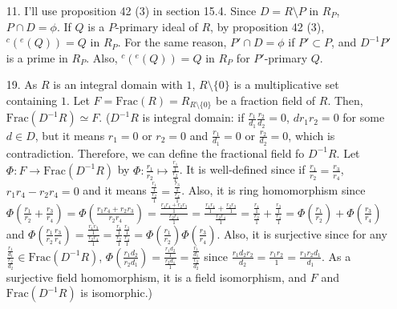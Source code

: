\documentclass[12pt]{article}
\begin{document}
\begin{enumerate}
\newpage
\item[11.] I'll use proposition 42 (3) in section 15.4. Since $D=R\setminus P$ in $R_P$, $P\cap D=\phi$. If $Q$ is a $P$-primary ideal of $R$, by proposition 42 (3), $^{c}(^{e}(Q))=Q$ in $R_P$. For the same reason, $P'\cap D=\phi$ if $P'\subset P$, and $D^{-1}P'$ is a prime in $R_P$. Also, $^{c}(^{e}(Q))=Q$ in $R_P$ for $P'$-primary $Q$.
\newpage
\item[19.] As $R$ is an integral domain with $1$, $R\setminus\{0\}$ is a multiplicative set containing $1$. Let $F=\text{Frac}(R)=R_{R\setminus\{0\}}$ be a fraction field of $R$. Then, $\text{Frac}(D^{-1}R)\simeq F$. ($D^{-1}R$ is integral domain: if $\frac{r_1}{d_1}\frac{r_2}{d_2}=0$, $dr_1r_2=0$ for some $d\in D$, but it means $r_1=0$ or $r_2=0$ and $\frac{r_1}{d_1}=0$ or $\frac{r_2}{d_2}=0$, which is contradiction. Therefore, we can define the fractional field fo $D^{-1}R$. Let $\Phi:F\rightarrow \text{Frac}(D^{-1}R)$ by $\Phi:\frac{r_1}{r_2}\mapsto \frac{\frac{r_1}{1}}{\frac{r_2}{1}}$. It is well-defined since if $\frac{r_1}{r_2}=\frac{r_3}{r_4}$, $r_1r_4-r_2r_4=0$ and it means $\frac{\frac{r_1}{1}}{\frac{r_2}{1}}=\frac{\frac{r_3}{1}}{\frac{r_4}{1}}$. Also, it is ring homomorphism since $\Phi\left(\frac{r_1}{r_2}+\frac{r_3}{r_4}\right)=\Phi\left(\frac{r_1r_4+r_2r_3}{r_2r_4}\right)= \frac{\frac{r_1r_4+r_2r_3}{1}}{\frac{r_2r_4}{1}}=\frac{\frac{r_1r_4}{1}+\frac{r_2r_3}{1}}{\frac{r_2r_4}{1}}=\frac{\frac{r_1}{1}}{\frac{r_2}{1}}+\frac{\frac{r_3}{1}}{\frac{r_4}{1}}=\Phi\left(\frac{r_1}{r_2}\right)+\Phi\left(\frac{r_3}{r_4}\right)$ and $\Phi\left(\frac{r_1}{r_2}\frac{r_3}{r_4}\right)=\frac{\frac{r_1r_3}{1}}{\frac{r_2r_4}{1}}=\frac{\frac{r_1}{1}}{\frac{r_2}{1}}\frac{\frac{r_3}{1}}{\frac{r_4}{1}}=\Phi\left(\frac{r_1}{r_2}\right)\Phi\left(\frac{r_3}{r_4}\right)$. Also, it is surjective since for any $\frac{\frac{r_1}{d_1}}{\frac{r_2}{d_2}}\in \text{Frac}(D^{-1}R)$, $\Phi\left(\frac{r_1d_2}{r_2d_1}\right)=\frac{\frac{r_1d_2}{1}}{\frac{r_2d_1}{1}}=\frac{\frac{r_1}{d_1}}{\frac{r_2}{d_2}}$ since $\frac{r_1d_2r_2}{d_2}=\frac{r_1r_2}{1}=\frac{r_1r_2d_1}{d_1}$. As a surjective field homomorphism, it is a field isomorphism, and $F$ and $\text{Frac}(D^{-1}R)$ is isomorphic.)


\end{enumerate}
\end{document}
